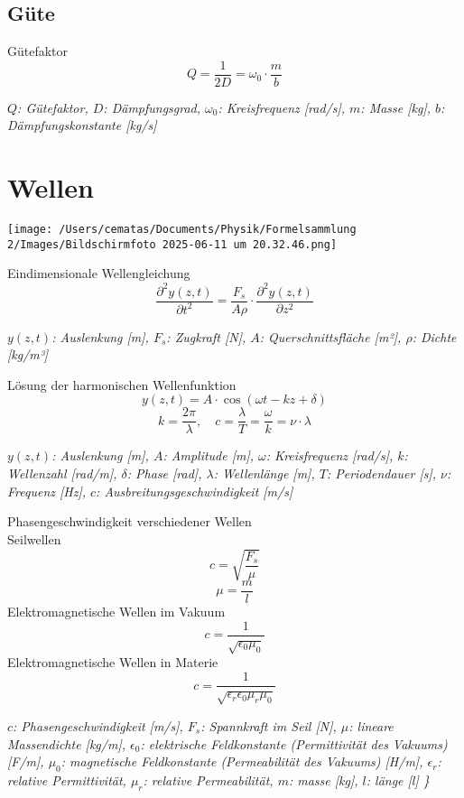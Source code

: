 \documentclass[a4paper,10pt]{article}
\newenvironment{displayformula}
{
	\begin{framed}
		\color{formulaColor}
	}
	{\end{framed}}
\newcommand{\formulalegend}[1]{%
	\par\vspace{0.5ex}%
	{{\color{legendColor}\RaggedRight\small\textit{#1}}}%
	\par\vspace{1.5ex}%
}
\begin{document}
\subsection{Güte}

\begin{displayformula}
	Gütefaktor
	\[
	Q = \frac{1}{2D} = \omega_0 \cdot \frac{m}{b}
	\]
\end{displayformula}
\formulalegend{
	\( Q \): Gütefaktor, \( D \): Dämpfungsgrad, \( \omega_0 \): Kreisfrequenz [rad/s], \( m \): Masse [kg], \( b \): Dämpfungskonstante [kg/s]
}

\newpage

\section{Wellen}

\texttt{[image: /Users/cematas/Documents/Physik/Formelsammlung 2/Images/Bildschirmfoto 2025-06-11 um 20.32.46.png]}

\begin{displayformula}
	Eindimensionale Wellengleichung
	\[
	\frac{\partial^2 y(z,t)}{\partial t^2} = \frac{F_s}{A \rho} \cdot \frac{\partial^2 y(z,t)}{\partial z^2}
	\]
\end{displayformula}
\formulalegend{
	\( y(z,t) \): Auslenkung [m], \( F_s \): Zugkraft [N], \( A \): Querschnittsfläche [m²], \( \rho \): Dichte [kg/m³]
}

\begin{displayformula}
	Lösung der harmonischen Wellenfunktion
	\[
	y(z, t) = A \cdot \cos(\omega t - kz + \delta)
	\]
	\[
	k = \frac{2\pi}{\lambda}, \quad c = \frac{\lambda}{T} = \frac{\omega}{k} = \nu \cdot \lambda
	\]
\end{displayformula}
\formulalegend{
	\( y(z,t) \): Auslenkung [m], \( A \): Amplitude [m], \( \omega \): Kreisfrequenz [rad/s], \( k \): Wellenzahl [rad/m], \( \delta \): Phase [rad], \( \lambda \): Wellenlänge [m], \( T \): Periodendauer [s], \( \nu \): Frequenz [Hz], \( c \): Ausbreitungsgeschwindigkeit [m/s]
}


\begin{displayformula}
	Phasengeschwindigkeit verschiedener Wellen \\ 
	Seilwellen
	\[
	c = \sqrt{\frac{F_s}{\mu}}
	\]
		\[
	\mu = \frac{m}{l}
	\]
	Elektromagnetische Wellen im Vakuum
	\[
	c = \frac{1}{\sqrt{\epsilon_0 \mu_0}}
	\]
	Elektromagnetische Wellen in Materie
	\[
	c = \frac{1}{\sqrt{\epsilon_r \epsilon_0 \mu_r \mu_0}}
	\]
\end{displayformula}
\formulalegend{
	\( c \): Phasengeschwindigkeit [m/s], 
	\( F_s \): Spannkraft im Seil [N], 
	\( \mu \): lineare Massendichte [kg/m], 
	\( \epsilon_0 \): elektrische Feldkonstante (Permittivität des Vakuums) [F/m], 
	\( \mu_0 \): magnetische Feldkonstante (Permeabilität des Vakuums) [H/m], 
	\( \epsilon_r \): relative Permittivität, 
	\( \mu_r \): relative Permeabilität,
	\(m\): masse [kg],
	\(l\): länge [l]
	\}
}
\end{document}
